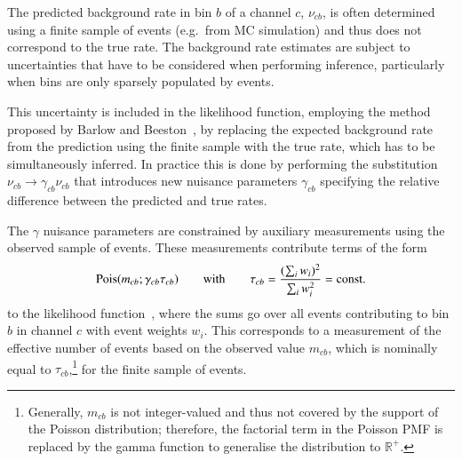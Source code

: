 The predicted background rate in bin $b$ of a channel $c$, $\nu_{cb}$, is often
determined using a finite sample of events (e.g.\ from MC simulation) and thus
does not correspond to the true rate. The background rate estimates are subject
to uncertainties that have to be considered when performing inference,
particularly when bins are only sparsely populated by events.

This uncertainty is included in the likelihood function, employing the method
proposed by Barlow and Beeston~\cite{barlow1993}, by replacing the expected
background rate from the prediction using the finite sample with the true rate,
which has to be simultaneously inferred. In practice this is done by performing
the substitution $\nu_{cb} \rightarrow \gamma_{cb} \nu_{cb}$ that introduces new
nuisance parameters $\gamma_{cb}$ specifying the relative difference between the
predicted and true rates.

The $\gamma$ nuisance parameters are constrained by auxiliary measurements using
the observed sample of events. These measurements contribute terms of the form
\begin{align*}
  \operatorname{Pois}(m_{cb} ; \gamma_{cb} \tau_{cb})
  \qquad \text{with} \qquad
  \tau_{cb} = \frac{( \sum_i w_i )^2}{\sum_i w_i^2} = \text{const.}
\end{align*}
to the likelihood function~\cite{cranmer2012}, where the sums go over all events
contributing to bin $b$ in channel $c$ with event weights $w_i$. This
corresponds to a measurement of the effective number of events based on the
observed value $m_{cb}$, which is nominally equal to
$\tau_{cb}$,\footnote{Generally, $m_{cb}$ is not integer-valued and thus not
  covered by the support of the Poisson distribution; therefore, the factorial
  term in the Poisson PMF is replaced by the gamma function to generalise the
  distribution to $\mathbb{R}^+$.} for the finite sample of events.

